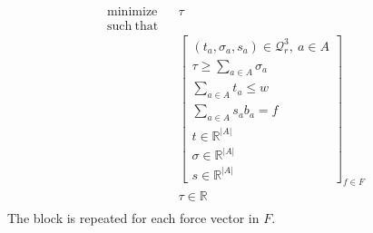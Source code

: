 \documentclass{article}
\begin{document}
\begin{eqnarray}
    \mathrm{minimize} &&  \tau \\
    \mathrm{such\ that} \\
    && \left[
        \begin{array}{l}
            (t_a,\sigma_a,s_a)\in\mathcal{Q}^3_r,\ a\in A\\
            \displaystyle \tau \geq \sum_{a\in A} \sigma_a \\
            \displaystyle \sum_{a\in A} t_a \leq w \\
            \displaystyle \sum_{a\in A} s_a b_a = f \\
            t\in\mathbb{R}^{|A|}\\
            \sigma\in\mathbb{R}^{|A|} \\
            s\in\mathbb{R}^{|A|} 
        \end{array}
    \right]_{f\in F} \\
    && \tau\in\mathbb{R}\\
\end{eqnarray}
The block is repeated for each force vector in $F$.
\end{document}
